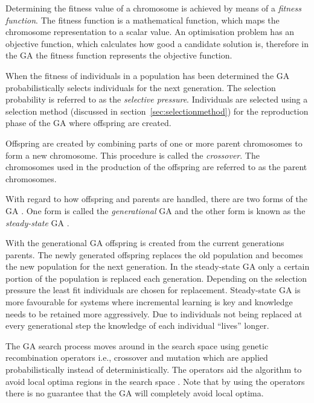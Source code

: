 Determining the fitness value of a chromosome is achieved by means of a \emph{fitness function}. The fitness function is a mathematical function, which maps the chromosome representation to a scalar value\cite{CompuIntelligenceIntro}. An optimisation problem has an objective function, which calculates how good a candidate solution is, therefore in the \gls{GA} the fitness function represents the objective function\cite{CompuIntelligenceIntro}.

When the fitness of individuals in a population has been determined the \gls{GA} probabilistically selects individuals for the next generation\cite{CompuIntelligenceIntro}. The selection probability is referred to as the \emph{selective pressure}\cite{CompuIntelligenceIntro}. Individuals are selected using a selection method (discussed in section~\ref{sec:selectionmethod}) for the reproduction phase of the \gls{GA} where offspring are created\cite{CompuIntelligenceIntro}.

Offspring are created by combining parts of one or more parent chromosomes to form a new chromosome. This procedure is called the \emph{crossover}\cite{CompuIntelligenceIntro}. The chromosomes used in the production of the offspring are referred to as the parent chromosomes\cite{CompuIntelligenceIntro}.

With regard to how offspring and parents are handled, there are two forms of the \gls{GA} \cite{FamilyGA}. One form is called the \emph{generational} \gls{GA}  and the other form is known as the \emph{steady-state} \gls{GA} \cite{GeostatisticalGA,FamilyGA}.

With the generational \gls{GA} offspring is created from the current generations parents. The newly generated offspring replaces the old population and becomes the new population for the next generation\cite{FamilyGA, SpringerIntroToGAs, IntroToGAs}. In the steady-state \gls{GA} only a certain portion of the population is replaced each generation. Depending on the selection pressure the least fit individuals are chosen for replacement\cite{GeostatisticalGA,FamilyGA, SpringerIntroToGAs, IntroToGAs}. Steady-state \gls{GA} is more favourable for systems where incremental learning is key and knowledge needs to be retained more aggressively\cite{SpringerIntroToGAs, IntroToGAs}. Due to individuals not being replaced at every generational step the knowledge of each individual ``lives'' longer\cite{SpringerIntroToGAs, IntroToGAs}.

The \gls{GA} search process moves around in the search space using genetic recombination operators i.e., crossover and mutation which are applied probabilistically instead of deterministically\cite{FamilyGA}. The operators aid the algorithm to avoid local optima regions in the search space \cite{HybridIntelliGA}. Note that by using the operators there is no guarantee that the \gls{GA} will completely avoid local optima\cite{CompuIntelligenceIntro}.


